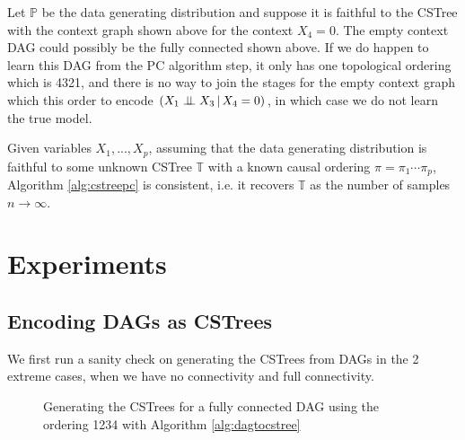 \documentclass{tufte-book}
\begin{document}
Let \(\mathbb{P}\) be the data generating distribution and suppose it is faithful to the CSTree with the context graph shown above for the context \(X_4=0\). The empty context DAG could possibly be the fully connected shown above. If we do happen to learn this DAG from the PC algorithm step, it only has one topological ordering which is 4321, and there is no way to join the stages for the empty context graph which this order to encode \((X_1 \perp \!\!\! \perp X_3 \,|\,X_4=0)\), in which case we do not learn the true model.


\begin{theorem}\label{alg:cstreepccorrectness}
Given variables $X_1,...,X_p$, assuming that the data generating distribution is faithful to some unknown CSTree $\mathbb{T}$ with a known causal ordering $\pi = \pi_1 \cdots \pi_p$, Algorithm \ref{alg:cstreepc} is consistent, i.e. it recovers $\mathbb{T}$ as the number of samples $n \rightarrow \infty$.
\end{theorem}



\chapter{Experiments}
\label{sec:org439490c}
\section{Encoding DAGs as CSTrees}
\label{sec:org3733bd5}
We first run a sanity check on generating the CSTrees from DAGs in the 2 extreme cases, when we have no connectivity and full connectivity.

\begin{figure}[!h]\label{fig:dagtocstree_cstree}
   \begin{floatrow}
%
\caption{Generating the CSTrees for a fully connected DAG using the ordering 1234 with Algorithm \ref{alg:dagtocstree}}
        
   \end{floatrow}
\end{figure}
\end{document}
